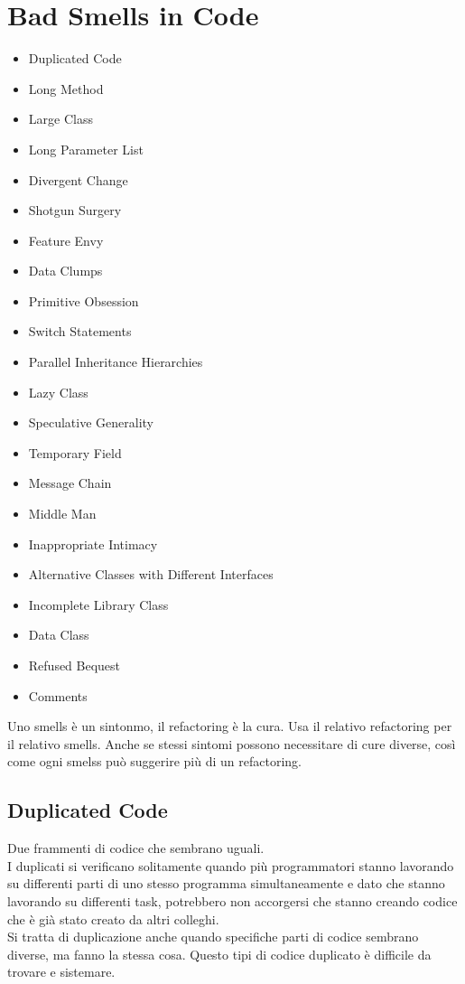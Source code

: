\section{Bad Smells in Code}
\begin{itemize}
    \item Duplicated Code
    \item Long Method
    \item Large Class
    \item Long Parameter List
    \item Divergent Change
    \item Shotgun Surgery
    \item Feature Envy
    \item Data Clumps
    \item Primitive Obsession
    \item Switch Statements
    \item Parallel Inheritance Hierarchies
    \item Lazy Class
    \item Speculative Generality
    \item Temporary Field
    \item Message Chain
    \item Middle Man
    \item Inappropriate Intimacy
    \item Alternative Classes with Different Interfaces
    \item Incomplete Library Class
    \item Data Class
    \item Refused Bequest
    \item Comments
\end{itemize}
Uno smells è un sintonmo, il refactoring è la cura. Usa il relativo refactoring per
il relativo smells. Anche se stessi sintomi possono necessitare di cure diverse, così come
ogni smelss può suggerire più di un refactoring.
\subsection{Duplicated Code}
Due frammenti di codice che sembrano uguali.\\
I duplicati si verificano solitamente quando più programmatori stanno lavorando
su differenti parti di uno stesso programma simultaneamente e dato che stanno 
lavorando su differenti task, potrebbero non accorgersi che stanno creando codice che
è già stato creato da altri colleghi.\\
Si tratta di duplicazione anche quando specifiche parti di codice sembrano diverse,
ma fanno la stessa cosa. Questo tipi di codice duplicato è difficile da trovare e sistemare.\\


